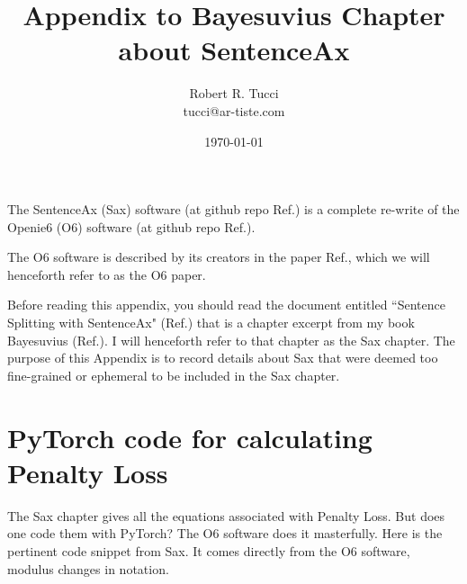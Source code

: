 \documentclass[12pt]{article}
\begin{document}
\title{Appendix
to Bayesuvius Chapter about SentenceAx}
\date{ \today}
\author{Robert R. Tucci\\
        tucci@ar-tiste.com}
\maketitle
The SentenceAx (Sax) software (at github repo Ref.\cite{sentence-ax-github}) is a complete re-write of the Openie6 (O6) software
(at github repo Ref.\cite{openie6-github}).

 The O6 software is described by its creators
 in the paper Ref.\cite{openie6-paper},
 which we will henceforth refer to as 
 the O6 paper.
 
 Before reading this appendix, you should read 
 the document entitled ``Sentence Splitting with SentenceAx" (Ref.\cite{openie6-paper}) that is a
 chapter 
 excerpt from my book Bayesuvius (Ref.\cite{bayesuvius}). I  will henceforth refer to that chapter as
 the Sax chapter. The purpose of this Appendix is to record details about Sax that were deemed too fine-grained or ephemeral to be included in the Sax chapter.


\section{PyTorch code for calculating Penalty Loss}

The Sax chapter gives all the equations
associated with Penalty Loss. But does one   code them with PyTorch?  The O6 software does it masterfully. Here is the pertinent code snippet from Sax.
It comes directly from the O6 software, modulus changes in notation.
\end{document}
